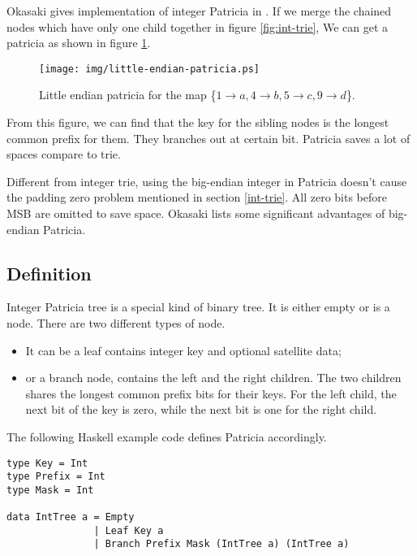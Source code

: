 \documentclass{article}
\begin{document}
Okasaki gives implementation of integer Patricia in \cite{okasaki-int-map}.
If we merge the chained nodes which have only one child together in figure \ref{fig:int-trie},
We can get a patricia as shown in figure \ref{fig:little-endian-patricia}.

\begin{figure}[htbp]
  \centering
  \texttt{[image: img/little-endian-patricia.ps]}
  \caption{Little endian patricia for the map
     \{$ 1 \rightarrow a, 4 \rightarrow b, 5 \rightarrow c, 9 \rightarrow d$\}.}
  \label{fig:little-endian-patricia}
\end{figure}

From this figure, we can find that the key for the sibling nodes is the
longest common prefix for them.
They branches out at certain bit. Patricia saves a lot of spaces compare
to trie.

Different from integer trie, using the big-endian integer in Patricia
doesn't cause the padding zero problem mentioned
in section \ref{int-trie}. All zero bits before MSB are omitted to save
space. Okasaki lists some significant advantages
of big-endian Patricia\cite{okasaki-int-map}.

\subsection{Definition}

Integer Patricia tree is a special kind of binary tree. It is either
empty or is a node. There are two different types of node.

\begin{itemize}
\item It can be a leaf contains integer key and optional satellite data;
\item or a branch node, contains the left and the right children. The
two children shares the longest common prefix bits for their keys.
For the left child, the next bit of the key is zero, while the next
bit is one for the right child.
\end{itemize}

The following Haskell example code defines Patricia accordingly.

\lstset{language=Haskell}
\begin{lstlisting}
type Key = Int
type Prefix = Int
type Mask = Int

data IntTree a = Empty
               | Leaf Key a
               | Branch Prefix Mask (IntTree a) (IntTree a)
\end{lstlisting}
\end{document}
